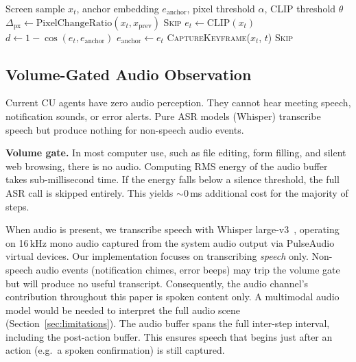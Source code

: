 \documentclass[11pt]{article}
\begin{document}
\begin{algorithm}[t]
\caption{Two-stage adaptive keyframe extraction (CLIP variant).
This algorithm is shown for completeness. The selection-method ablation in
Section~\ref{sec:ablation} finds it statistically indistinguishable from
the simpler pixel-only gate (Stage~1) and uniform / random sampling, so the
default selector in every main result is Stage~1 alone.}
\label{alg:keyframe}
\begin{algorithmic}[1]
\REQUIRE Screen sample $x_t$, anchor embedding $e_\text{anchor}$, pixel threshold $\alpha$, CLIP threshold $\theta$
\STATE $\Delta_\text{px} \leftarrow \text{PixelChangeRatio}(x_t, x_\text{prev})$
  \RETURN \textsc{Skip} 
\ENDIF
\STATE $e_t \leftarrow \text{CLIP}(x_t)$
\STATE $d \leftarrow 1 - \cos(e_t, e_\text{anchor})$
  \STATE $e_\text{anchor} \leftarrow e_t$ 
  \RETURN \textsc{CaptureKeyframe}($x_t$, $t$)
\ENDIF
\RETURN \textsc{Skip} 
\end{algorithmic}
\end{algorithm}

\subsection{Volume-Gated Audio Observation}
\label{sec:audio}

Current CU agents have zero audio perception.
They cannot hear meeting speech, notification sounds, or error alerts.
Pure ASR models (Whisper) transcribe speech but produce nothing for non-speech audio events.

\textbf{Volume gate.}
In most computer use, such as file editing, form filling, and silent web browsing, there is no audio.
Computing RMS energy of the audio buffer takes sub-millisecond time.
If the energy falls below a silence threshold, the full ASR call is skipped entirely.
This yields ${\sim}0$\,ms additional cost for the majority of steps.

When audio is present, we transcribe speech with Whisper large-v3~\citep{whisper}, operating on 16\,kHz mono audio captured from the system audio output via PulseAudio virtual devices.
Our implementation focuses on transcribing \emph{speech} only. Non-speech audio events (notification chimes, error beeps) may trip the volume gate but will produce no useful transcript. Consequently, the audio channel's contribution throughout this paper is spoken content only. A multimodal audio model would be needed to interpret the full audio scene (Section~\ref{sec:limitations}).
The audio buffer spans the full inter-step interval, including the post-action buffer. This ensures speech that begins just after an action (e.g.\ a spoken confirmation) is still captured.
\end{document}
